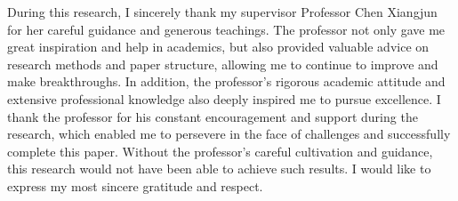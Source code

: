 \begin{Thanks}
    During this research, I sincerely thank my supervisor Professor Chen Xiangjun for her careful guidance and generous teachings. The professor not only gave me great inspiration and help in academics, but also provided valuable advice on research methods and paper structure, allowing me to continue to improve and make breakthroughs. In addition, the professor's rigorous academic attitude and extensive professional knowledge also deeply inspired me to pursue excellence. I thank the professor for his constant encouragement and support during the research, which enabled me to persevere in the face of challenges and successfully complete this paper. Without the professor's careful cultivation and guidance, this research would not have been able to achieve such results. I would like to express my most sincere gratitude and respect.
\end{Thanks}